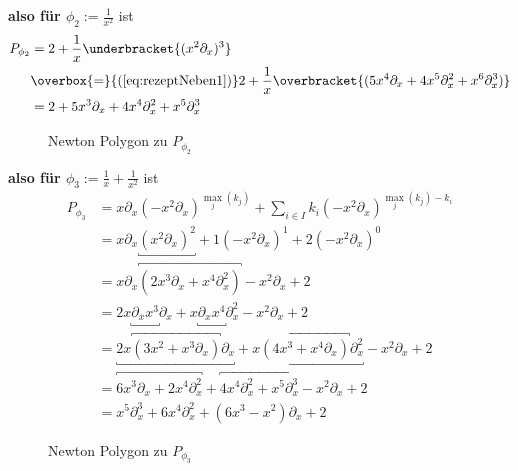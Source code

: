 \textbf{also für $\phi_2:=\frac{1}{x^2}$} ist
\begin{align*}
P_{\phi_2} &=2+\frac{1}{x}\underbracket{(x^2\partial_x)^{3}}\\
           &\overbox{=}{(\ref{eq:rezeptNeben1})}2+\frac{1}{x}
             \overbracket{(5x^4\partial_x+4x^5\partial_x^2+x^6\partial_x^3)}\\
           &=2+5x^3\partial_x+4x^{4}\partial_x^2+x^5\partial_x^3
\end{align*}
\begin{figure}[H]
\caption{Newton Polygon zu $P_{\phi_2}$}
\begin{center}
\end{center}
\end{figure}

\textbf{also für
$\phi_3:=\frac{1}{x}+\frac{1}{x^2}$} ist
\begin{align*}
P_{\phi_3} &=x\partial_x(-x^2\partial_x)^{\max_j(k_j)}
    +\sum_{i\in I} k_i(-x^2\partial_x)^{\max_j(k_j)-k_i}\\
  &=x\partial_x\underbracket{(x^2\partial_x)^{2}}
    +1(-x^2\partial_x)^{1}+2(-x^2\partial_x)^{0}\\
  &=x\partial_x \overbracket{(2x^3\partial_x+x^4\partial_x^2)}
    -x^2\partial_x+2\\
  &=2x\underbracket{\partial_xx^3}\partial_x
    +x\underbracket{\partial_xx^4}\partial_x^2
    -x^2\partial_x+2\\
  &=\underbracket{2x\overbracket{(3x^2+x^3\partial_x)}\partial_x}
    +\underbracket{x\overbracket{(4x^3+x^4\partial_x)}\partial_x^2}
    -x^2\partial_x+2\\
  &=\overbracket{6x^3\partial_x+2x^4\partial_x^2}
    +\overbracket{4x^4\partial_x^2+x^5\partial_x^3}
    -x^2\partial_x+2\\
  &= x^5\partial_x^3+6x^4\partial_x^2+(6x^3-x^2)\partial_x+2
\end{align*}
\begin{figure}[H]
\caption{Newton Polygon zu $P_{\phi_3}$}
\begin{center}
\end{center}
\end{figure}

